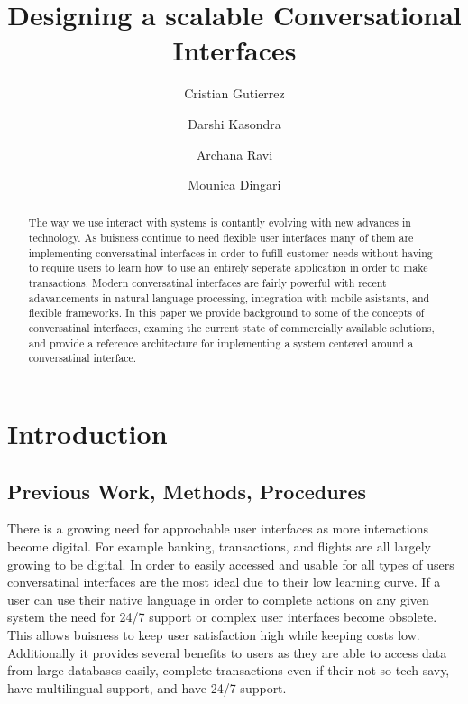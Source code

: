 \documentclass[9pt,software]{livecoms}
\title{Designing a scalable Conversational Interfaces}
\author[1\authfn{3}]{Cristian Gutierrez}
\author[1\authfn{3}]{Darshi Kasondra}
\author[1\authfn{3}]{Archana Ravi}
\author[1\authfn{3}]{Mounica Dingari}
\affil[1]{California State University of Northridge}
\begin{document}
\begin{frontmatter}
\maketitle

\begin{abstract}
The way we use interact with systems is contantly evolving with new advances in technology. As buisness continue to need flexible user
interfaces many of them are implementing conversatinal interfaces in order to fufill customer needs without having to require users
to learn how to use an entirely seperate application in order to make transactions. Modern conversatinal interfaces are fairly powerful 
with recent adavancements in natural language processing, integration with mobile asistants, and flexible frameworks. In this paper we 
provide background to some of the concepts of conversatinal interfaces, examing the current state of commercially available
solutions, and provide a reference architecture for implementing a system centered around a conversatinal interface.
\end{abstract}

\end{frontmatter}

\section{Introduction}

\subsection{Previous Work, Methods, Procedures}
There is a growing need for approchable user interfaces as more interactions become digital. For example banking, transactions, and flights
are all largely growing to be digital. In order to easily accessed and usable for all types of users conversatinal interfaces are the most 
ideal due to their low learning curve. If a user can use their native language in order to complete actions on any given system the need for
24/7 support or complex user interfaces become obsolete. This allows buisness to keep user satisfaction high while keeping costs low. Additionally
it provides several benefits to users as they are able to access data from large databases easily, complete transactions even if their not so tech savy,
have multilingual support, and have 24/7 support.
\end{document}
